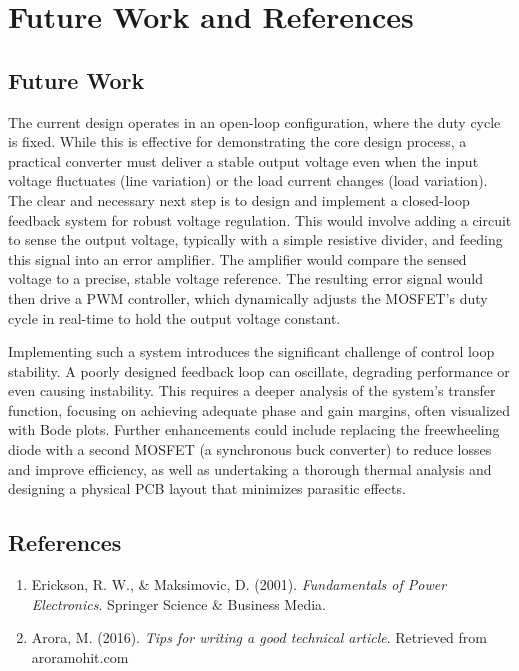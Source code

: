 \documentclass[12pt, a4paper]{article}
\begin{document}
\section{Future Work and References}



\subsection{Future Work}

The current design operates in an open-loop configuration, where the duty cycle is fixed. While this is effective for demonstrating the core design process, a practical converter must deliver a stable output voltage even when the input voltage fluctuates (line variation) or the load current changes (load variation). The clear and necessary next step is to design and implement a closed-loop feedback system for robust voltage regulation. This would involve adding a circuit to sense the output voltage, typically with a simple resistive divider, and feeding this signal into an error amplifier. The amplifier would compare the sensed voltage to a precise, stable voltage reference. The resulting error signal would then drive a PWM controller, which dynamically adjusts the MOSFET's duty cycle in real-time to hold the output voltage constant.



Implementing such a system introduces the significant challenge of control loop stability. A poorly designed feedback loop can oscillate, degrading performance or even causing instability. This requires a deeper analysis of the system's transfer function, focusing on achieving adequate phase and gain margins, often visualized with Bode plots. Further enhancements could include replacing the freewheeling diode with a second MOSFET (a synchronous buck converter) to reduce losses and improve efficiency, as well as undertaking a thorough thermal analysis and designing a physical PCB layout that minimizes parasitic effects.



\subsection{References}

\begin{enumerate}

    \item Erickson, R. W., \& Maksimovic, D. (2001). \textit{Fundamentals of Power Electronics}. Springer Science \& Business Media.

    \item Arora, M. (2016). \textit{Tips for writing a good technical article}. Retrieved from aroramohit.com

\end{enumerate}
\end{document}
